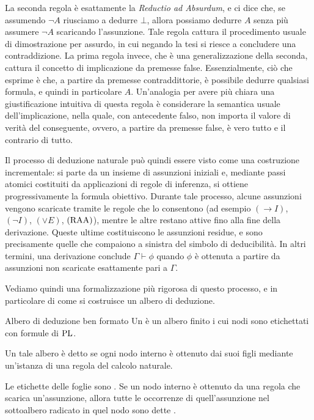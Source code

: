 La seconda regola è esattamente la \textit{Reductio ad Absurdum}, e ci dice che, se assumendo \(\neg A\) riusciamo a dedurre \(\bot\), allora possiamo dedurre \(A\) senza più assumere \(\neg A\) scaricando l'assunzione. Tale regola cattura il procedimento usuale di dimostrazione per assurdo, in cui negando la tesi si riesce a concludere una contraddizione. La prima regola invece, che è una generalizzazione della seconda, cattura il concetto di implicazione da premesse false.
Essenzialmente, ciò che esprime è che, a partire da premesse contraddittorie, è possibile dedurre qualsiasi formula, e quindi in particolare \(A\). Un'analogia per avere più chiara una giustificazione intuitiva di questa regola è considerare la semantica usuale dell'implicazione, nella quale, con antecedente falso, non importa il valore di verità del conseguente, ovvero, a partire da premesse false, è vero tutto e il contrario di tutto.

Il processo di deduzione naturale può quindi essere visto come una costruzione incrementale: si parte da un insieme di assunzioni iniziali e, mediante passi atomici costituiti da applicazioni di regole di inferenza, si ottiene progressivamente la formula obiettivo.
Durante tale processo, alcune assunzioni vengono scaricate tramite le regole che lo consentono (ad esempio \((\to I)\), \((\neg I)\), \((\lor E)\), \((\operatorname{RAA})\)), mentre le altre restano attive fino alla fine della derivazione.
Queste ultime costituiscono le assunzioni residue, e sono precisamente quelle che compaiono a sinistra del simbolo di deducibilità.
In altri termini, una derivazione conclude \(\Gamma \vdash \phi\) quando \(\phi\) è ottenuta a partire da assunzioni non scaricate esattamente pari a \(\Gamma\).

Vediamo quindi una formalizzazione più rigorosa di questo processo, e in particolare di come si costruisce un albero di deduzione.

\begin{definition}{Albero di deduzione ben formato}
  Un  è un albero finito i cui nodi sono etichettati con formule di \(\operatorname{PL}\).
  
  Un tale albero è detto  se ogni nodo interno è ottenuto dai suoi figli mediante un'istanza di una regola del calcolo naturale.
  
  Le etichette delle foglie sono .
  Se un nodo interno è ottenuto da una regola che scarica un'assunzione, allora tutte le occorrenze di quell'assunzione nel sottoalbero radicato in quel nodo sono dette .
\end{definition}

